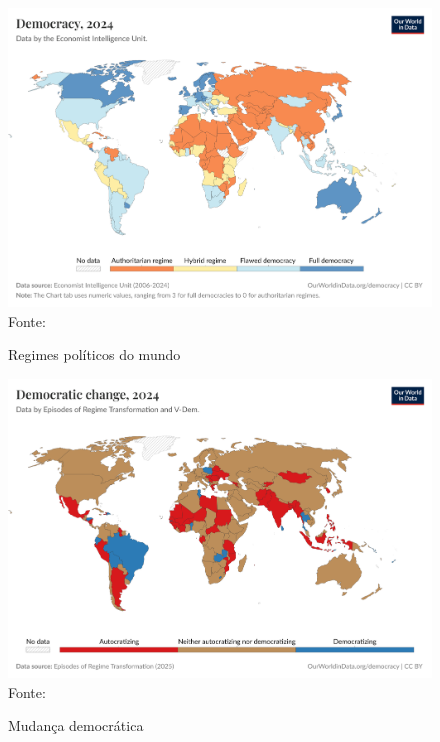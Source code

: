 \begin{figure}[ht]
    \centering
    \caption{Regimes políticos do mundo}
    \includegraphics[width=1\linewidth]{figuras/democracia/political-regime-eiu.png}
    \label{fig:political-regime-eiu}
    \footnotesize{Fonte: \cite{political_regime_eiu}}
\end{figure}

\begin{figure}[htbp]
    \centering
    \caption{Mudança democrática}
    \includegraphics[width=1\linewidth]{figuras/democracia/political-regime-ert.png}
    \label{fig:political-regime-ert}
    \footnotesize{Fonte: \cite{political_regime_ert}}
\end{figure}

